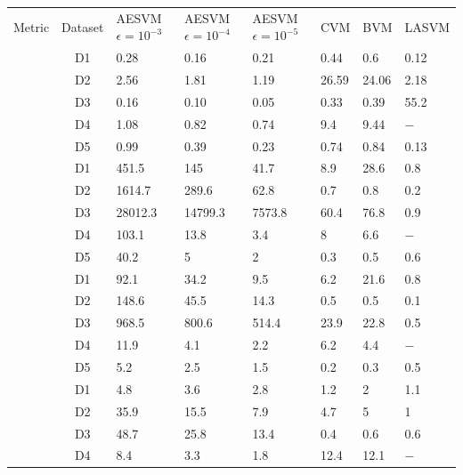 \documentclass[twoside]{article}
\begin{document}
\begin{table}[h!]
\begin{center}
\begin{tabular}{|c!{\vrule width 1pt}c!{\vrule width 1pt}p{1.5cm}|p{1.5cm}|p{1.5cm}|l|l|l|} \hline
Metric& Dataset& AESVM $\epsilon = 10^{-3}$ & AESVM $\epsilon = 10^{-4}$ & AESVM $\epsilon = 10^{-5}$ & CVM & BVM & LASVM\\ 
&D1 & 0.28 & 0.16 & 0.21 & 0.44 & 0.6 & 0.12\\ 
&D2 & 2.56 & 1.81 & 1.19 & 26.59 & 24.06 &2.18\\ 
&D3 & 0.16 & 0.10 & 0.05 & 0.33 & 0.39 & 55.2  \\ 
&D4 & 1.08 & 0.82 & 0.74 & 9.4 & 9.44 & \hspace{0.6cm}$-$ \\ 
&D5 & 0.99 &0.39 & 0.23 & 0.74 & 0.84 & 0.13 \\ 
&D1 & 451.5 & 145 & 41.7 & 8.9 & 28.6 & 0.8\\ 
&D2 & 1614.7 & 289.6 & 62.8 & 0.7 & 0.8 & 0.2\\ 
&D3 & 28012.3 & 14799.3 & 7573.8 & 60.4 & 76.8 & 0.9 \\ 
&D4 & 103.1 & 13.8 & 3.4 & 8 & 6.6 & \hspace{0.6cm}$-$ \\ 
&D5 & 40.2 & 5 & 2 & 0.3 & 0.5 & 0.6 \\ 
&D1 & 92.1 & 34.2 & 9.5 & 6.2 & 21.6 & 0.8\\ 
&D2 & 148.6 & 45.5 & 14.3 & 0.5 & 0.5 & 0.1\\ 
&D3 & 968.5 & 800.6 & 514.4 & 23.9 & 22.8 & 0.5 \\ 
&D4 & 11.9 & 4.1 & 2.2 & 6.2 & 4.4 & \hspace{0.6cm}$-$ \\ 
&D5 & 5.2 & 2.5 & 1.5 & 0.2 & 0.3 & 0.5 \\ 
&D1 & 4.8 & 3.6 & 2.8 & 1.2 & 2 & 1.1\\ 
&D2 & 35.9 & 15.5 & 7.9 & 4.7 & 5 & 1\\ 
&D3 & 48.7 & 25.8 & 13.4 & 0.4 & 0.6 & 0.6 \\ 
&D4 & 8.4 & 3.3 & 1.8 & 12.4 & 12.1 & \hspace{0.6cm}$-$ \\ 

\end{tabular}
\end{center}
\end{table}
\end{document}
